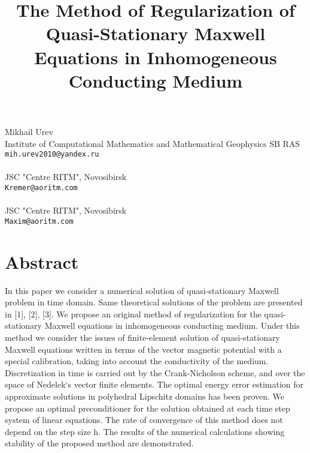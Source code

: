 \title{The Method of Regularization of Quasi-Stationary Maxwell Equations in Inhomogeneous Conducting Medium}
\author{}  \institute{}
\maketitle
\begin{center}
{\large Mikhail Urev}\\
Institute of Computational Mathematics and Mathematical Geophysics SB RAS\\
{\tt mih.urev2010@yandex.ru}
\\ \vspace{4mm}{\large Igor Kremer}\\
JSC "Centre RITM", Novosibirsk \\
{\tt Kremer@aoritm.com}
\\ \vspace{4mm}{\large Maxim Ivanov}\\
JSC "Centre RITM", Novosibirsk \\
{\tt Maxim@aoritm.com}

\end{center}

\section*{Abstract}

In this paper we consider a numerical solution of quasi-stationary Maxwell problem in time domain. Same theoretical solutions of the problem are presented in [1], [2], [3]. We propose an original method of regularization for the quasi-stationary Maxwell equations in inhomogeneous conducting medium. Under this method we consider the issues of finite-element solution of quasi-stationary Maxwell equations written in terms of the vector magnetic potential with a special calibration, taking into account the conductivity of the medium. Discretization in time is carried out by the Crank-Nicholson scheme, and over the space of Nedelek`s vector finite elements. The optimal energy error estimation for approximate solutions in polyhedral Lipschitz domains has been proven. We propose an optimal preconditioner for the solution obtained at each time step system of linear equations. The rate of convergence of this method does not depend on the step size h. The results of the numerical calculations showing stability of the proposed method are demonstrated.

